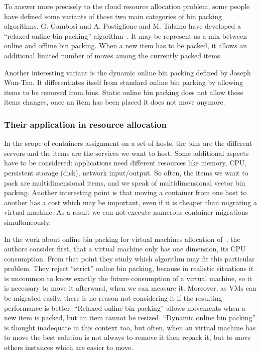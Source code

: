 To answer more precisely to the cloud resource allocation problem, some people
have defined some variants of those two main categories of bin packing
algorithms. G. Gambosi and A. Postiglione and M. Talamo have developed a
“relaxed online bin packing” algorithm~\cite*{mathsRelaxedonlinebp}. It may be
represent as a mix between online and offline bin packing. When a new item has
to be packed, it allows an additional limited number of moves among the
currently packed items.

Another interesting variant is the dynamic online bin packing defined by Joseph
Wun-Tan.  It differentiates itself from standard online bin packing by allowing
items to be removed from bins. Static online bin packing does not allow these
items changes, once an item has been placed it does not move anymore.

\subsubsection{Their application in resource allocation}

In the scope of containers assignment on a set of hosts, the bins are the
different servers and the items are the services we want to host. Some
additional aspects have to be considered: applications need different
resources like memory, CPU, persistent storage (disk), network input/output. So
often, the items we want to pack are multidimensional items, and we speak of
multidimensional vector bin packing. Another interesting point is that moving a
container from one host to another has a cost which may be important, even if it
is cheaper than migrating a virtual machine. As a result we can not execute
numerous container migrations simultaneously.

In the work about online bin packing for virtual machines allocation
of~\cite*{reassignmentVisbp}, the authors consider first, that a virtual
machine only has one dimension, its CPU consumption. From that point they study
which algorithm may fit this particular problem. They reject “strict” online
bin packing, because in realistic situations it is uncommon to know exactly
the future consumption of a virtual machine, so it is necessary to move it
afterward, when we can measure it. Moreover, as VMs can be migrated easily,
there is no reason not considering it if the resulting performance is better.
“Relaxed online bin packing” allows movements when a new item is packed, but
an item cannot be resized. “Dynamic online bin packing” is thought inadequate
in this context too, but often, when an virtual machine has to move the best
solution is not always to remove it then repack it, but to move others instances
which are easier to move.


